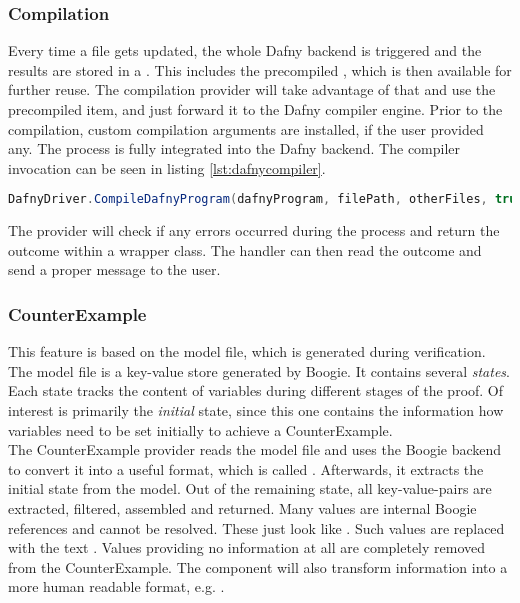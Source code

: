 \subsubsection{Compilation}
Every time a file gets updated, the whole Dafny backend is triggered and the results are stored in a .
This includes the precompiled , which is then available for further reuse.
The compilation provider will take advantage of that and use the precompiled item, and just forward it to the Dafny compiler engine.
Prior to the compilation, custom compilation arguments are installed, if the user provided any.
The process is fully integrated into the Dafny backend.
The compiler invocation can be seen in listing \ref{lst:dafnycompiler}.\\

\begin{lstlisting}[language=csharp, caption={Calling the Dafny Compiler}, captionpos=b, label={lst:dafnycompiler}]
DafnyDriver.CompileDafnyProgram(dafnyProgram, filePath, otherFiles, true, textWriter);
\end{lstlisting}

The provider will check if any errors occurred during the process and return the outcome within a wrapper class.
The handler can then read the outcome and send a proper message to the user.

\subsubsection{CounterExample}
This feature is based on the model file, which is generated during verification.
The model file is a key-value store generated by Boogie.
It contains several \textit{states}.
Each state tracks the content of variables during different stages of the proof.
Of interest is primarily the \textit{initial} state, since this one contains the information how variables
need to be set initially to achieve a CounterExample.\\

The CounterExample provider reads the model file and uses the Boogie backend to convert it into a useful format, which is called .
Afterwards, it extracts the initial state from the model.
Out of the remaining state, all key-value-pairs are extracted, filtered, assembled and returned.
Many values are internal Boogie references and cannot be resolved.
These just look like .
Such values are replaced with the text .
Values providing no information at all are completely removed from the CounterExample.
The component will also transform information into a more human readable format, e.g. .\\




